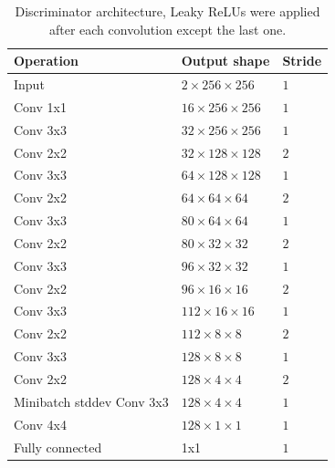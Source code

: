 \begin{table}[t]
    \centering
    \caption{Discriminator architecture, Leaky ReLUs were applied after each convolution except the last one. }
    \label{tab:discriminator}
    \begin{tabular}{|lll|}
        \hline
        Operation          & Output shape     & Stride \\ \hline
        Input              & $2\times256\times256$   &$1$  \\
        Conv 1x1           & $16\times256\times256$ &$1$   \\ 
        Conv 3x3           & $32\times256\times256$ &$1$   \\ 
        Conv 2x2           & $32\times128\times128$ &$2$   \\ \hline
        Conv 3x3           & $64\times128\times128$ &$1$   \\ 
        Conv 2x2           & $64\times64\times64$ &$2$     \\ \hline
        Conv 3x3           & $80\times64\times64$ &$1$     \\ 
        Conv 2x2           & $80\times32\times32$ &$2$     \\ \hline
        Conv 3x3           & $96\times32\times32$ &$1$     \\ 
        Conv 2x2           & $96\times16\times16$ &$2$     \\ \hline
        Conv 3x3           & $112\times16\times16$ &$1$    \\ 
        Conv 2x2           & $112\times8\times8$ &$2$      \\ \hline
        Conv 3x3           & $128\times8\times8$ &$1$      \\ 
        Conv 2x2           & $128\times4\times4$ &$2$      \\ \hline
        Minibatch stddev
        Conv 3x3           & $128\times4\times4$   &$1$    \\
        Conv 4x4           & $128\times1\times1$   &$1$    \\ 
        Fully connected    & 1x1 &$1$        \\ \hline
    \end{tabular}
\end{table}

